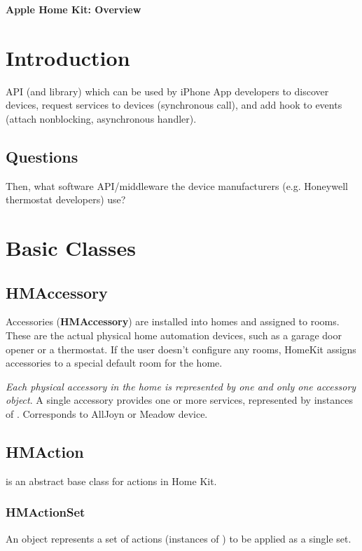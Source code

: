 \documentclass{myproc}
\begin{document}
\small


\begin{center}
{\large\bf Apple Home Kit: Overview}
\end{center}

\vspace*{1cm}

\tableofcontents


\section{Introduction}
API (and library) which can be used by iPhone App developers to discover
devices, request services to devices (synchronous call), and add hook to
events (attach nonblocking, asynchronous handler).

\subsection{Questions}
\bit
\w Then, what software API/middleware the device manufacturers
(e.g. Honeywell thermostat developers) use?
\eit

\section{Basic Classes}
\subsection{HMAccessory}
\textcolor{blue2}{Accessories (\textbf{HMAccessory}) are installed into homes
  and assigned to rooms. These are the actual physical home automation devices,
  such as a garage door opener or a thermostat. If the user doesn't configure
  any rooms, HomeKit assigns accessories to a special default room for the
  home. }  

{\em Each physical accessory in
  the home is represented by one and only one accessory object\/}. A single 
accessory
provides one or more services, represented by instances of .
\textcolor{red2}{Corresponds to AllJoyn or Meadow device.}


\subsection{HMAction}
 is an abstract base class for actions in Home Kit.

\subsubsection{HMActionSet}
 An  object represents a set of actions (instances of
 ) to 
 be applied as a single set. 
\end{document}
